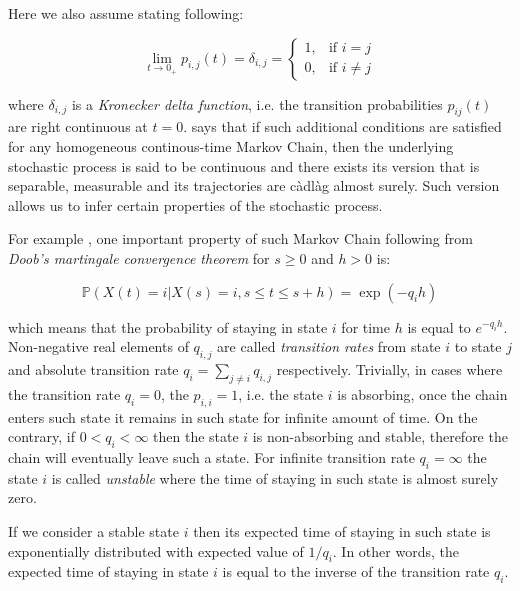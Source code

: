 Here we also assume \citep{Gallager2013} stating following:

\begin{equation}
    \lim_{t \to 0_{+}} p_{i,j}(t) = \delta_{i,j} = 
        \begin{cases}
            1, & \text{if } i = j\\
            0, & \text{if } i \neq j
        \end{cases}
\end{equation}

where $\delta_{i,j}$ is a \textit{Kronecker delta function}, i.e. the transition probabilities $p_{ij}(t)$ are right continuous at $t=0$. \citep{Norris2012} says that if such additional conditions are satisfied for any homogeneous continous-time Markov Chain, 
then the underlying stochastic process is said to be continuous and there exists its version that is separable, measurable and its trajectories are càdlàg almost surely. Such version allows us to infer 
certain properties of the stochastic process.

For example \citep{Gidi2018}, one important property of such Markov Chain following from \textit{Doob's martingale convergence theorem} for $s \geq 0$ and $h>0$ is:

\begin{equation}
    \mathbb{P}(X(t) = i|X(s)=i, s \leq t \leq s+h) = \exp(-{q_i}h)
\end{equation}

which means that the probability of staying in state $i$ for time $h$ is equal to $e^{-{q_i}h}$. 
Non-negative real elements of $q_{i,j}$ are called \textit{transition rates} from state $i$ to state $j$ and absolute transition 
rate $q_i = \sum_{j \neq i} q_{i,j}$ respectively. Trivially, in cases where the transition rate $q_i=0$, the $p_{i,i} = 1$, i.e. the state $i$ is absorbing, 
once the chain enters such state it remains in such state for infinite amount of time. On the contrary, if $0 < q_i < \infty$ then the state $i$ is non-absorbing and stable, therefore
the chain will eventually leave such a state. For infinite transition rate $q_i = \infty$ the state $i$ is called {\it unstable} where the time of staying in such state is almost surely zero. \citep{Praskova2012}

If we consider a stable state $i$ then its expected time of staying in such state is exponentially 
distributed with expected value of $1/q_i$. In other words, the expected time of staying in state $i$ is equal 
to the inverse of the transition rate $q_i$. \citep{Norris2012}

